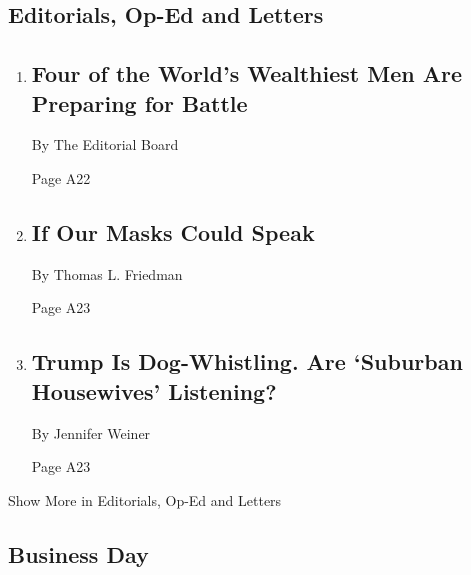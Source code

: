 \hypertarget{editorials-op-ed-and-letters}{%
\subsection{Editorials, Op-Ed and
Letters}\label{editorials-op-ed-and-letters}}

\begin{enumerate}
\def\labelenumi{\arabic{enumi}.}
\item
  \href{/2020/07/28/opinion/tech-ceo-hearing-congress.html}{}

  \hypertarget{four-of-the-worlds-wealthiest-men-are-preparing-for-battle}{%
  \subsection{Four of the World's Wealthiest Men Are Preparing for
  Battle}\label{four-of-the-worlds-wealthiest-men-are-preparing-for-battle}}

  By The Editorial Board

  Page A22
\item
  \href{/2020/07/28/opinion/coronavirus-masks.html}{}

  \hypertarget{if-our-masks-could-speak}{%
  \subsection{If Our Masks Could Speak}\label{if-our-masks-could-speak}}

  By Thomas L. Friedman

  Page A23
\item
  \href{/2020/07/28/opinion/trump-white-women.html}{}

  \hypertarget{trump-is-dog-whistling-are-suburban-housewives-listening}{%
  \subsection{Trump Is Dog-Whistling. Are `Suburban Housewives'
  Listening?}\label{trump-is-dog-whistling-are-suburban-housewives-listening}}

  By Jennifer Weiner

  Page A23
\end{enumerate}

Show More in Editorials, Op-Ed and Letters

\hypertarget{business-day}{%
\subsection{Business Day}\label{business-day}}

